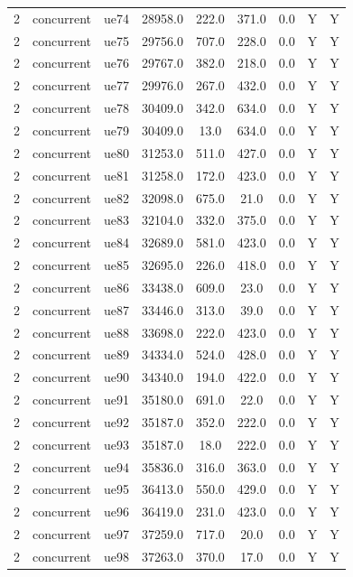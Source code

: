 \begin{table}[ht]
\begin{tabular}{|c|c|c|c|c|c|c|c|c|}
2 & concurrent & ue74 & 28958.0 & 222.0 & 371.0 & 0.0 & Y & Y \\
2 & concurrent & ue75 & 29756.0 & 707.0 & 228.0 & 0.0 & Y & Y \\
2 & concurrent & ue76 & 29767.0 & 382.0 & 218.0 & 0.0 & Y & Y \\
2 & concurrent & ue77 & 29976.0 & 267.0 & 432.0 & 0.0 & Y & Y \\
2 & concurrent & ue78 & 30409.0 & 342.0 & 634.0 & 0.0 & Y & Y \\
2 & concurrent & ue79 & 30409.0 & 13.0 & 634.0 & 0.0 & Y & Y \\
2 & concurrent & ue80 & 31253.0 & 511.0 & 427.0 & 0.0 & Y & Y \\
2 & concurrent & ue81 & 31258.0 & 172.0 & 423.0 & 0.0 & Y & Y \\
2 & concurrent & ue82 & 32098.0 & 675.0 & 21.0 & 0.0 & Y & Y \\
2 & concurrent & ue83 & 32104.0 & 332.0 & 375.0 & 0.0 & Y & Y \\
2 & concurrent & ue84 & 32689.0 & 581.0 & 423.0 & 0.0 & Y & Y \\
2 & concurrent & ue85 & 32695.0 & 226.0 & 418.0 & 0.0 & Y & Y \\
2 & concurrent & ue86 & 33438.0 & 609.0 & 23.0 & 0.0 & Y & Y \\
2 & concurrent & ue87 & 33446.0 & 313.0 & 39.0 & 0.0 & Y & Y \\
2 & concurrent & ue88 & 33698.0 & 222.0 & 423.0 & 0.0 & Y & Y \\
2 & concurrent & ue89 & 34334.0 & 524.0 & 428.0 & 0.0 & Y & Y \\
2 & concurrent & ue90 & 34340.0 & 194.0 & 422.0 & 0.0 & Y & Y \\
2 & concurrent & ue91 & 35180.0 & 691.0 & 22.0 & 0.0 & Y & Y \\
2 & concurrent & ue92 & 35187.0 & 352.0 & 222.0 & 0.0 & Y & Y \\
2 & concurrent & ue93 & 35187.0 & 18.0 & 222.0 & 0.0 & Y & Y \\
2 & concurrent & ue94 & 35836.0 & 316.0 & 363.0 & 0.0 & Y & Y \\
2 & concurrent & ue95 & 36413.0 & 550.0 & 429.0 & 0.0 & Y & Y \\
2 & concurrent & ue96 & 36419.0 & 231.0 & 423.0 & 0.0 & Y & Y \\
2 & concurrent & ue97 & 37259.0 & 717.0 & 20.0 & 0.0 & Y & Y \\
2 & concurrent & ue98 & 37263.0 & 370.0 & 17.0 & 0.0 & Y & Y \\

\end{tabular}
\end{table}
